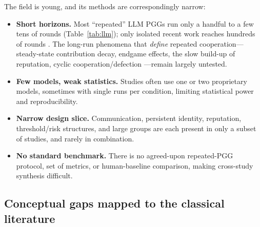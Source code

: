 \documentclass[11pt,a4paper]{article}
\begin{document}
The field is young, and its methods are correspondingly narrow:
\begin{itemize}
  \item \textbf{Short horizons.} Most ``repeated'' LLM PGGs run only a handful to
  a few tens of rounds (Table~\ref{tab:llm}); only isolated recent work reaches
  hundreds of rounds \citep{liu2026memory}. The long-run phenomena that
  \emph{define} repeated cooperation---steady-state contribution decay, endgame
  effects, the slow build-up of reputation, cyclic cooperation/defection
  \citep{vansegbroeck2012emergence}---remain largely untested.
  \item \textbf{Few models, weak statistics.} Studies often use one or two
  proprietary models, sometimes with single runs per condition, limiting
  statistical power and reproducibility.
  \item \textbf{Narrow design slice.} Communication, persistent identity,
  reputation, threshold/risk structures, and large groups are each present in only
  a subset of studies, and rarely in combination.
  \item \textbf{No standard benchmark.} There is no agreed-upon repeated-PGG
  protocol, set of metrics, or human-baseline comparison, making cross-study
  synthesis difficult.
\end{itemize}

\subsection{Conceptual gaps mapped to the classical literature}
\end{document}
